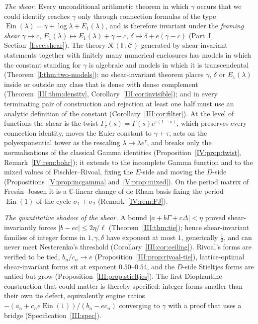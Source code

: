 \documentclass[11pt,a4paper]{article}
\newcommand{\C}{\mathbb C}
\newcommand{\Ein}{\operatorname{Ein}}
\newcommand{\Fld}{\mathbb F}
\newcommand{\Th}{\mathcal K}
\theoremstyle{definition}
\theoremstyle{remark}
\numberwithin{equation}{section}
\begin{document}
\emph{The shear.} Every unconditional arithmetic theorem in which $\gamma$ occurs that we
could identify reaches $\gamma$ only through connection formulas of the type
$\Ein(\lambda)=\gamma+\log\lambda+E_1(\lambda)$, and is therefore invariant under the
\emph{framing shear} $\gamma\mapsto c$, $E_1(\lambda)\mapsto E_1(\lambda)+\gamma-c$,
$\delta\mapsto\delta+e(\gamma-c)$ (Part~I, Section~\ref{I:sec:shear}). The theory
$\Th(\Fld;\mathcal C)$ generated by shear-invariant statements together with finitely many
numerical enclosures has models in which the constant standing for $\gamma$ is algebraic
and models in which it is transcendental (Theorem~\ref{I:thm:two-models}); no
shear-invariant theorem places $\gamma$, $\delta$ or $E_1(\lambda)$ inside or outside any
class that is dense with dense complement (Theorem~\ref{III:thm:density},
Corollary~\ref{III:cor:invisible}); and in every terminating pair of construction and
rejection at least one half must use an analytic definition of the constant
(Corollary~\ref{III:cor:filter}). At the level of functions the shear is the twist
$\Gamma_\tau(s)=\Gamma(s)e^{\tau(1-s)}$, which preserves every connection identity, moves
the Euler constant to $\gamma+\tau$, acts on the polyexponential tower as the rescaling
$\lambda\mapsto\lambda e^\tau$, and breaks only the normalisations of the classical
Gamma identities (Proposition~\ref{IV:prop:twist}, Remark~\ref{IV:rem:bohr}); it extends to
the incomplete Gamma function and to the mixed values of Fischler--Rivoal, fixing the
$E$-side and moving the $D$-side (Propositions~\ref{V:prop:incgamma}
and~\ref{V:prop:mixed}). On the period matrix of Fres\'an--Jossen it is a $\C$-linear
change of de Rham basis fixing the period $\Ein(1)$ of the cycle $\sigma_1+\sigma_2$
(Remark~\ref{IV:rem:FJ}).

\emph{The quantitative shadow of the shear.} A bound $|a+b\Gamma+c\Delta|<\eta$ proved
shear-invariantly forces $|b-ec|\le2\eta/\ell$ (Theorem~\ref{III:thm:tie}); hence
shear-invariant families of integer forms in $1,\gamma,\delta$ have exponent at most $1$,
generically $\tfrac12$, and can never meet Nesterenko's threshold
(Corollary~\ref{III:cor:ceiling}). Rivoal's forms are verified to be tied, $b_n/c_n\to e$
(Proposition~\ref{III:prop:rivoal-tie}), lattice-optimal shear-invariant forms sit at
exponent $0.50$--$0.54$, and the $D$-side Stieltjes forms are untied but grow
(Proposition~\ref{III:prop:stieltjes}). The first Diophantine construction that could
matter is thereby specified: integer forms smaller than their own tie defect, equivalently
engine ratios $-(a_n+c_ne\Ein(1))/(b_n-ec_n)$ converging to $\gamma$ with a proof that uses
a bridge (Specification~\ref{III:spec}).
\end{document}
